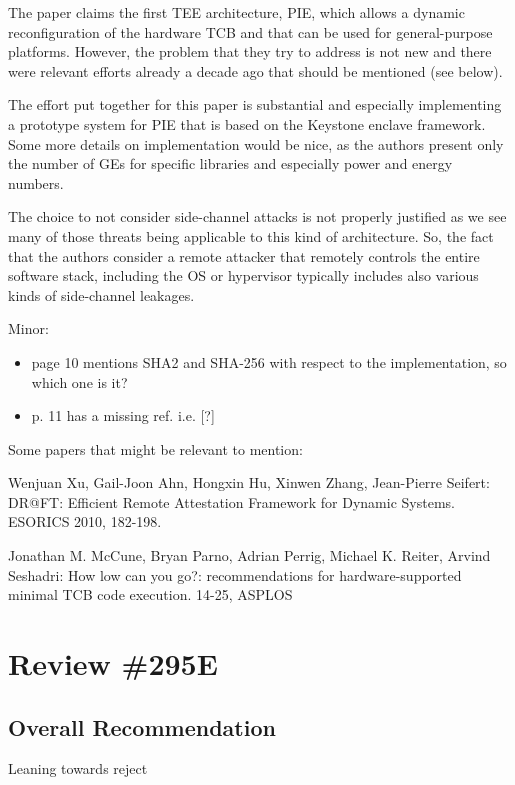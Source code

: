 \documentclass[9pt]{article}
\begin{document}
The paper claims the first TEE architecture, PIE, which allows a dynamic
reconfiguration of the hardware TCB and that can be used for
general-purpose platforms. However, the problem that they try to address
is not new and there were relevant efforts already a decade ago that
should be mentioned (see below).

The effort put together for this paper is substantial and especially
implementing a prototype system for PIE that is based on the Keystone
enclave framework. Some more details on implementation would be nice, as
the authors present only the number of GEs for specific libraries and
especially power and energy numbers.

The choice to not consider side-channel attacks is not properly
justified as we see many of those threats being applicable to this kind
of architecture. So, the fact that the authors consider a remote
attacker that remotely controls the entire software stack, including the
OS or hypervisor typically includes also various kinds of side-channel
leakages.

Minor:

\begin{itemize}

\item
  page 10 mentions SHA2 and SHA-256 with respect to the implementation,
  so which one is it?
\item
  p. 11 has a missing ref. i.e. {[}?{]}
\end{itemize}

Some papers that might be relevant to mention:

Wenjuan Xu, Gail-Joon Ahn, Hongxin Hu, Xinwen Zhang, Jean-Pierre
Seifert: DR@FT: Efficient Remote Attestation Framework for Dynamic
Systems. ESORICS 2010, 182-198.

Jonathan M. McCune, Bryan Parno, Adrian Perrig, Michael K. Reiter,
Arvind Seshadri: How low can you go?: recommendations for
hardware-supported minimal TCB code execution. 14-25, ASPLOS

\section{Review \#295E}

\subsection{Overall Recommendation}


  Leaning towards reject
\end{document}
